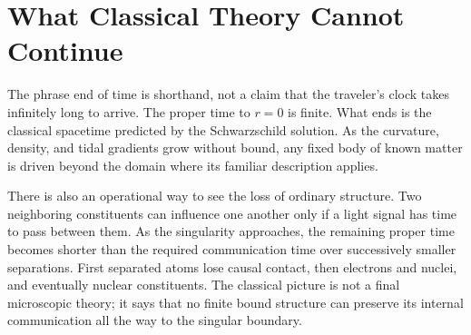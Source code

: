 \begin{classroomqa}
\end{classroomqa}

\section{What Classical Theory Cannot Continue}

The phrase end of time is shorthand, not a claim that the traveler's
clock takes infinitely long to arrive.  The proper time to \(r=0\) is
finite.  What ends is the classical spacetime predicted by the
Schwarzschild solution.  As the curvature, density, and tidal
gradients grow without bound, any fixed body of known matter is driven
beyond the domain where its familiar description applies.

\begin{classroomqa}
\end{classroomqa}

There is also an operational way to see the loss of ordinary
structure.  Two neighboring constituents can influence one another
only if a light signal has time to pass between them.  As the
singularity approaches, the remaining proper time becomes shorter
than the required communication time over successively smaller
separations.  First separated atoms lose causal contact, then
electrons and nuclei, and eventually nuclear constituents.  The
classical picture is not a final microscopic theory; it says that no
finite bound structure can preserve its internal communication all
the way to the singular boundary.

